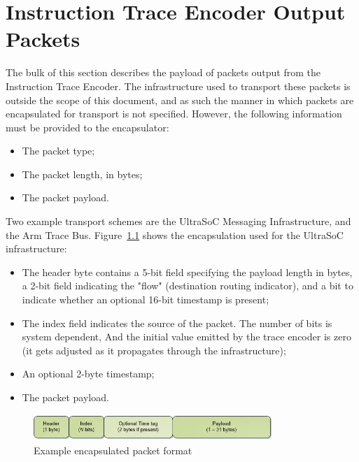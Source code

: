 \chapter{Instruction Trace Encoder Output Packets} \label{packets}

The bulk of this section describes the payload of packets output from the Instruction Trace Encoder.
The infrastructure used to transport these packets is outside the scope of this document, and
as such the manner in which packets are encapsulated for transport is not specified.
However, the following information must be provided to the encapsulator:

\begin{itemize}
  \item The packet type;
  \item The packet length, in bytes;
  \item The packet payload.
\end{itemize}

Two example transport schemes are the UltraSoC Messaging Infrastructure, and the Arm Trace Bus.
Figure~\ref{fig:packet-format} shows the encapsulation used for the UltraSoC infrastructure:
\begin{itemize}
  \item The header byte contains a 5-bit field specifying the payload length in bytes, a 2-bit
    field indicating the "flow" (destination routing indicator), and a bit to indicate whether
    an optional 16-bit timestamp is present;
  \item The index field indicates the source of the packet.  The number of bits is system dependent,
    And the initial value emitted by the trace encoder is zero (it gets adjusted as it propagates 
    through the infrastructure);
  \item An optional 2-byte timestamp;
  \item The packet payload.
\end{itemize}

\begin{figure}[h]
  \begin{center}
    \includegraphics[height=1cm, width=9cm]{newPacket.jpg}
    \caption{Example encapsulated packet format}
    \label{fig:packet-format}
  \end{center}
\end{figure}


